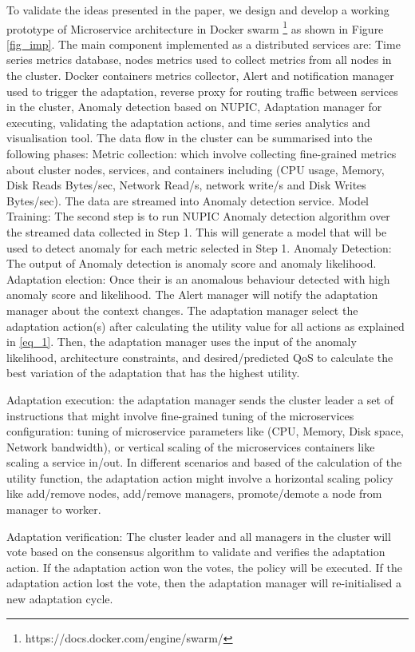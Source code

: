 \documentclass[sigconf]{acmart}
\begin{document}
To validate the ideas presented in the paper, we design and develop a working prototype of Microservice architecture in Docker swarm \footnote{https://docs.docker.com/engine/swarm/} as shown in Figure \ref{fig_imp}. The main component implemented as a distributed services are: Time series metrics database, nodes metrics used to collect metrics from all nodes in the cluster. Docker containers metrics collector, Alert and notification manager used to trigger the adaptation, reverse proxy for routing traffic between services in the cluster, Anomaly detection based on NUPIC, Adaptation manager for executing, validating the adaptation actions, and time series analytics and visualisation tool. 
The data flow in the cluster can be summarised into the following phases: 
Metric collection: which involve collecting fine-grained metrics about cluster nodes, services, and containers including (CPU usage, Memory, Disk Reads Bytes/sec, Network Read/s, network write/s and Disk Writes Bytes/sec). The data are streamed into Anomaly detection service. 
Model Training: The second step is to run NUPIC Anomaly detection algorithm over the streamed data collected in Step 1. This will generate a model that will be used to detect anomaly for each metric selected in Step 1. 
Anomaly Detection: The output of Anomaly detection is anomaly score and anomaly likelihood. 
Adaptation election: Once their is an anomalous behaviour detected with high anomaly score and likelihood. The Alert manager will notify the adaptation manager about the context changes. The adaptation manager select the adaptation action(s) after calculating the utility value for all actions as explained in \ref{eq_1}. Then, the adaptation manager uses the input of the anomaly likelihood, architecture constraints, and desired/predicted QoS to calculate the best variation of the adaptation that has the highest utility. 

Adaptation execution: the adaptation manager sends the cluster leader a set of instructions that might involve fine-grained tuning of the microservices configuration: tuning of microservice parameters like (CPU, Memory, Disk space, Network bandwidth), or vertical scaling of the microservices containers like scaling a service in/out. In different scenarios and based of the calculation of the utility function, the adaptation action might involve a horizontal scaling policy like add/remove nodes, add/remove managers, promote/demote a node from manager to worker. 

Adaptation verification: The cluster leader and all managers in the cluster will vote based on the consensus algorithm to validate and verifies the adaptation action. If the adaptation action won the votes, the policy will be executed. If the adaptation action lost the vote, then the adaptation manager will re-initialised a new adaptation cycle.  
 
\end{document}
